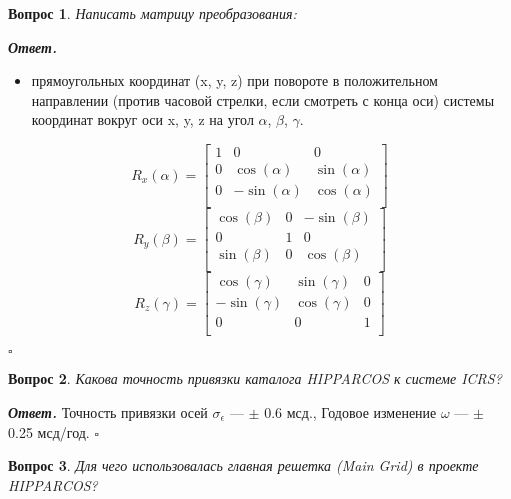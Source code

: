 \documentclass[12pt]{article}
\newtheorem{problem}{Вопрос}
\newenvironment{solution}[1][\it{Ответ}]{\textbf{#1. } }{$\square$}
\begin{document}
	\begin{problem}
		Написать матрицу преобразования:
	\end{problem}
	
	\begin{solution}
		
		\begin{itemize}
			\item прямоугольных координат (x, y, z) при повороте в положительном направлении (против часовой стрелки, если смотреть с конца оси) системы координат вокруг оси x, y, z	
			на угол $\alpha$, $\beta$, $\gamma$.
		\end{itemize}
		
			\[
			R_{x}(\alpha) =
			\left[ {\begin{array}{ccc}
				1	& 0 & 0 \\
				0	& 	\cos(\alpha) & \sin(\alpha) \\
				0	&  -\sin(\alpha) &	\cos(\alpha)\\	
			\end{array} } \right]
			\]
			\[
			R_{y}(\beta) =
			\left[ {\begin{array}{ccc}
						\cos(\beta)	& 0 &- \sin(\beta) \\
					0	& 	1 & 0  \\
					\sin(\beta)	&  0 &		\cos(\beta)\\	
			\end{array} } \right]
			\]
			\[
			R_{z}(\gamma) =
			\left[ {\begin{array}{ccc}
						\cos(\gamma)	& 	\sin(\gamma) & 0 \\
					-\sin(\gamma)	& 	\cos(\gamma) & 0 \\
					0	&0&1 \\	
			\end{array} } \right]
			\]
		
	\end{solution}
	
	
	\begin{problem}
		Какова точность привязки каталога HIPPARCOS к системе ICRS?
	\end{problem}
	
	\begin{solution}
		Точность привязки осей $\sigma_{\epsilon}$ — $\pm$ 0.6 мсд., Годовое изменение $\omega$ — $\pm$ 0.25 мсд/год.
	\end{solution}
	
	\begin{problem}
		Для чего использовалась главная решетка (Main Grid) в проекте HIPPARCOS?
	\end{problem}
	
\end{document}
